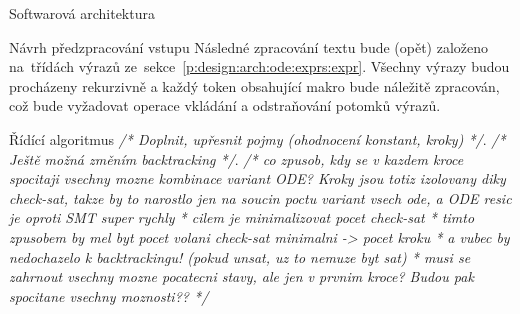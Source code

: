 \documentclass[thesis=M,czech]{FITthesis}[2012/06/26]
\newcommand{\cmt}[1]{\textit{/* #1 */}}
\newcommand{\rf}[1]{\ref{#1}}
\begin{document}
\begin{section}{Softwarová architektura}
\begin{subsection}{Návrh předzpracování vstupu}
Následné zpracování textu bude (opět) založeno na~třídách výrazů
ze~sekce~\rf{p:design:arch:ode:exprs:expr}.
Všechny výrazy budou procházeny rekurzivně
a každý token obsahující makro bude náležitě zpracován,
což bude vyžadovat operace vkládání a odstraňování potomků výrazů.
\end{subsection} %


\begin{subsection}{Řídící algoritmus}\label{ss:design:arch:alg}
\cmt{Doplnit, upřesnit pojmy (ohodnocení konstant, kroky)}.
\cmt{Ještě možná změním backtracking}.
\cmt{co zpusob, kdy se v kazdem kroce spocitaji vsechny mozne kombinace variant ODE? Kroky jsou totiz izolovany diky check-sat, takze by to narostlo jen na soucin poctu variant vsech ode, a ODE resic je oproti SMT super rychly
  * cilem je minimalizovat pocet check-sat
  * timto zpusobem by mel byt pocet volani check-sat minimalni -> pocet kroku
  * a vubec by nedochazelo k backtrackingu! (pokud unsat, uz to nemuze byt sat)
  * musi se zahrnout vsechny mozne pocatecni stavy, ale jen v prvnim kroce?
   Budou pak spocitane vsechny moznosti??}


\end{subsection}
\end{section}
\end{document}
